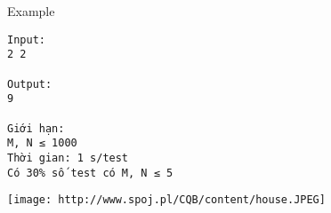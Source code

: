 Example
\begin{verbatim}
Input:
2 2

Output:
9

Giới hạn:
M, N ≤ 1000
Thời gian: 1 s/test
Có 30% số test có M, N ≤ 5 
\end{verbatim}


\texttt{[image: http://www.spoj.pl/CQB/content/house.JPEG]}